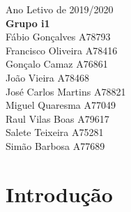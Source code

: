 \documentclass[11pt,a4paper]{article}
\begin{document}
\begin{titlepage}
{\large Ano Letivo de 2019/2020}\\ %

\vspace*{\fill}
\noindent
{\large \textbf{Grupo i1}}\\[0.5cm]
Fábio Gonçalves \textsc{A78793}\\[0.3cm]
Francisco Oliveira \textsc{A78416}\\[0.3cm]
Gonçalo Camaz \textsc{A76861}\\[0.3cm]
João Vieira \textsc{A78468}\\[0.3cm]
José Carlos Martins \textsc{A78821}\\[0.3cm]
Miguel Quaresma \textsc{A77049}\\[0.3cm]
Raul Vilas Boas \textsc{A79617}\\[0.3cm]
Salete Teixeira \textsc{A75281}\\[0.3cm]
Simão Barbosa \textsc{A77689}

\end{titlepage}

\newpage

\thispagestyle{empty}
\setcounter{page}{0}
\tableofcontents
\clearpage

\newpage

\section{Introdução}
\end{document}
